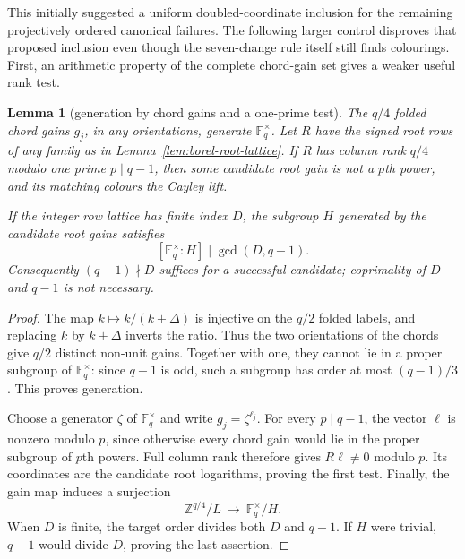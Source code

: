 \documentclass[11pt,a4paper]{article}
\newtheorem{lemma}[theorem]{Lemma}
\theoremstyle{definition}
\theoremstyle{remark}
\newcommand{\ZZ}{\mathbb{Z}}
\begin{document}
This initially suggested a uniform doubled-coordinate inclusion for the remaining projectively ordered canonical failures.  The following larger control disproves that proposed inclusion even though the seven-change rule itself still finds colourings.  First, an arithmetic property of the complete chord-gain set gives a weaker useful rank test.

\begin{lemma}[generation by chord gains and a one-prime test]\label{lem:borel-gain-generation}
The $q/4$ folded chord gains $g_j$, in any orientations, generate $\mathbb F_q^\times$.  Let $R$ have the signed root rows of any family as in Lemma~\ref{lem:borel-root-lattice}.  If $R$ has column rank $q/4$ modulo \emph{one} prime $p\mid q-1$, then some candidate root gain is not a $p$th power, and its matching colours the Cayley lift.

If the integer row lattice has finite index $D$, the subgroup $H$ generated by the candidate root gains satisfies
\[
                    [\mathbb F_q^\times:H]\mid\gcd(D,q-1).
\]
Consequently $(q-1)\nmid D$ suffices for a successful candidate; coprimality of $D$ and $q-1$ is not necessary.
\end{lemma}
\begin{proof}
The map $k\mapsto k/(k+\Delta)$ is injective on the $q/2$ folded labels, and replacing $k$ by $k+\Delta$ inverts the ratio.  Thus the two orientations of the chords give $q/2$ distinct non-unit gains.  Together with one, they cannot lie in a proper subgroup of $\mathbb F_q^\times$: since $q-1$ is odd, such a subgroup has order at most $(q-1)/3$.  This proves generation.

Choose a generator $\zeta$ of $\mathbb F_q^\times$ and write $g_j=\zeta^{\ell_j}$.  For every $p\mid q-1$, the vector $\ell$ is nonzero modulo $p$, since otherwise every chord gain would lie in the proper subgroup of $p$th powers.  Full column rank therefore gives $R\ell\ne0$ modulo $p$.  Its coordinates are the candidate root logarithms, proving the first test.  Finally, the gain map induces a surjection
\[
               \ZZ^{q/4}/L\ \longrightarrow\ \mathbb F_q^\times/H.
\]
When $D$ is finite, the target order divides both $D$ and $q-1$.  If $H$ were trivial, $q-1$ would divide $D$, proving the last assertion.
\end{proof}
\end{document}
